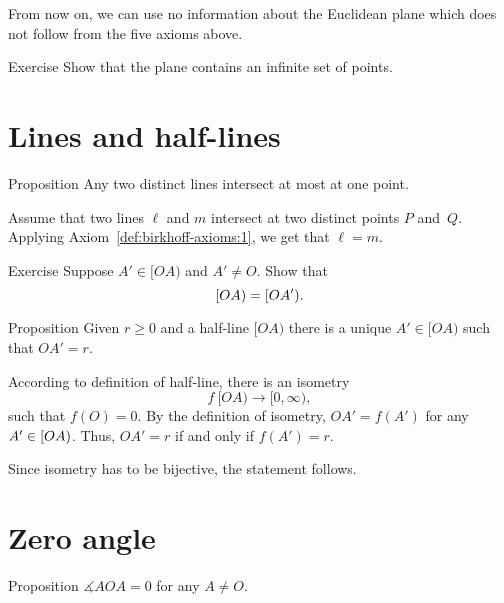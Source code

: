 From now on,  
we can use no information about the Euclidean plane which does not follow from the five axioms above.

\begin{thm}{Exercise}\label{ex:infinite}
Show that the plane contains an infinite set of points.
\end{thm}

\section*{Lines and half-lines}

\begin{thm}[\abs]{Proposition}\label{lem:line-line}
\let\thefootnote\relax{}
Any two distinct lines intersect at most at one point.
\end{thm}

Assume that two lines $\ell$ and $m$ intersect at two distinct points $P$ and~$Q$.
Applying Axiom~\ref{def:birkhoff-axioms:1}, we get that $\ell=m$.
\qeds

\begin{thm}{Exercise}\label{ex:[OA)=[OA')}
Suppose $A'\in[OA)$ and $A'\not=O$. 
Show that 
\[[O A)\z=[O A').\]

\end{thm}

\begin{thm}[\abs]{Proposition}\label{prop:point-on-half-line}
Given $r\ge 0$ and a half-line $[O A)$ there is a unique $A'\in [O A)$  such that $O A'=r$.
\end{thm}

According to definition of half-line, 
there is an isometry 
$$f\:[O A)\to [0,\infty),$$
such that $f(O)=0$.
By the definition of isometry, $O A'=f(A')$ for any $A'\z\in [O A)$.
Thus, $O A'=r$ if and only if $f(A')=r$.

Since isometry has to be bijective, the statement follows.
\qeds

\section*{Zero angle}

\begin{thm}[\abs]{Proposition}\label{lem:AOA=0}
$\measuredangle A O A= 0$ for any $A\not=O$.
\end{thm}

